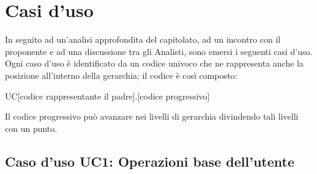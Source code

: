 \section{Casi d'uso}
In seguito ad un'analisi approfondita del capitolato, ad un incontro con il proponente \Zucchetti e ad una discussione tra gli Analisti, sono emersi i seguenti casi d'uso.\\
Ogni caso d'uso è identificato da un codice univoco che ne rappresenta anche la posizione all'interno della gerarchia; il codice è così composto:
\begin{center}
UC[codice rappresentante il padre].[codice progressivo]
\end{center}
Il codice progressivo può avanzare nei livelli di gerarchia divindendo tali livelli con un punto.

\newpage






\subsection{Caso d'uso UC1: Operazioni base dell'utente}

